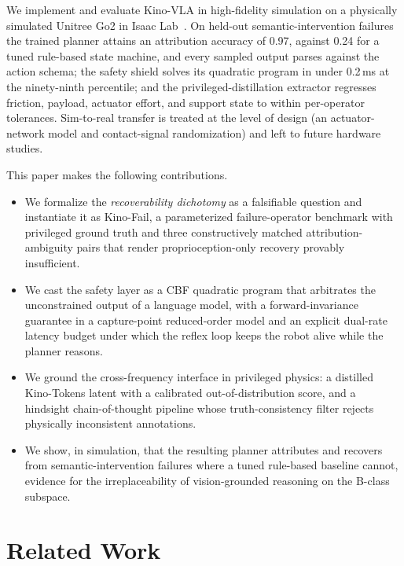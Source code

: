 \documentclass[conference]{IEEEtran}
\newcommand{\kinovla}{Kino-VLA}
\newcommand{\kinofail}{Kino-Fail}
\newcommand{\kinotokens}{Kino-Tokens}
\begin{document}
We implement and evaluate \kinovla{} in high-fidelity simulation on a physically
simulated Unitree Go2 in Isaac Lab~\cite{makoviychuk2021isaacgym,mittal2023orbit}.
On held-out semantic-intervention failures the trained planner attains an
attribution accuracy of \mbox{0.97}, against \mbox{0.24} for a tuned rule-based
state machine, and every sampled output parses against the action schema; the
safety shield solves its quadratic program in under \mbox{0.2\,ms} at the
ninety-ninth percentile; and the privileged-distillation extractor regresses
friction, payload, actuator effort, and support state to within per-operator
tolerances. Sim-to-real transfer is treated at the level of design (an
actuator-network model and contact-signal randomization) and left to future
hardware studies.

\noindent This paper makes the following contributions.
\begin{itemize}
  \item We formalize the \emph{recoverability dichotomy} as a falsifiable
  question and instantiate it as \kinofail{}, a parameterized failure-operator
  benchmark with privileged ground truth and three constructively matched
  attribution-ambiguity pairs that render proprioception-only recovery provably
  insufficient.
  \item We cast the safety layer as a CBF quadratic program that arbitrates the
  unconstrained output of a language model, with a forward-invariance guarantee in
  a capture-point reduced-order model and an explicit dual-rate latency budget
  under which the reflex loop keeps the robot alive while the planner reasons.
  \item We ground the cross-frequency interface in privileged physics: a distilled
  \kinotokens{} latent with a calibrated out-of-distribution score, and a hindsight
  chain-of-thought pipeline whose truth-consistency filter rejects physically
  inconsistent annotations.
  \item We show, in simulation, that the resulting planner attributes and recovers
  from semantic-intervention failures where a tuned rule-based baseline cannot,
  evidence for the irreplaceability of vision-grounded reasoning on the B-class
  subspace.
\end{itemize}

\section{Related Work}
\label{sec:related}
\end{document}
